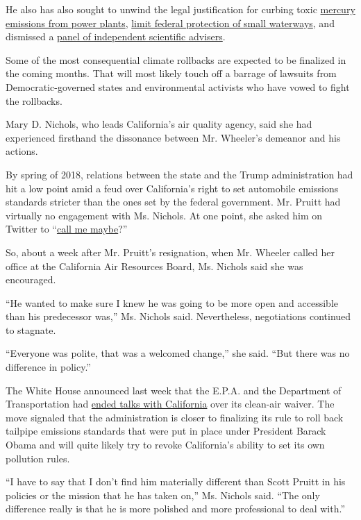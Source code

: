 He also has also sought to unwind the legal justification for curbing
toxic
\href{https://www.nytimes.com/2018/12/28/climate/mercury-coal-pollution-regulations.html}{mercury
emissions from power plants},
\href{https://www.nytimes.com/2018/12/06/climate/trump-water-pollution-wotus-replacement.html}{limit
federal protection of small waterways}, and dismissed a
\href{https://www.nytimes.com/2018/10/11/climate/epa-disbands-pollution-science-panel.html}{panel
of independent scientific advisers}.

Some of the most consequential climate rollbacks are expected to be
finalized in the coming months. That will most likely touch off a
barrage of lawsuits from Democratic-governed states and environmental
activists who have vowed to fight the rollbacks.

Mary D. Nichols, who leads California's air quality agency, said she had
experienced firsthand the dissonance between Mr. Wheeler's demeanor and
his actions.

By spring of 2018, relations between the state and the Trump
administration had hit a low point amid a feud over California's right
to set automobile emissions standards stricter than the ones set by the
federal government. Mr. Pruitt had virtually no engagement with Ms.
Nichols. At one point, she asked him on Twitter to
``\href{https://twitter.com/MaryNicholsCA/status/989995570382041089}{call
me maybe}?''

So, about a week after Mr. Pruitt's resignation, when Mr. Wheeler called
her office at the California Air Resources Board, Ms. Nichols said she
was encouraged.

``He wanted to make sure I knew he was going to be more open and
accessible than his predecessor was,'' Ms. Nichols said. Nevertheless,
negotiations continued to stagnate.

``Everyone was polite, that was a welcomed change,'' she said. ``But
there was no difference in policy.''

The White House announced last week that the E.P.A. and the Department
of Transportation had
\href{https://www.nytimes.com/2019/02/21/climate/california-tailpipe-emissions.html}{ended
talks with California} over its clean-air waiver. The move signaled that
the administration is closer to finalizing its rule to roll back
tailpipe emissions standards that were put in place under President
Barack Obama and will quite likely try to revoke California's ability to
set its own pollution rules.

``I have to say that I don't find him materially different than Scott
Pruitt in his policies or the mission that he has taken on,'' Ms.
Nichols said. ``The only difference really is that he is more polished
and more professional to deal with.''

